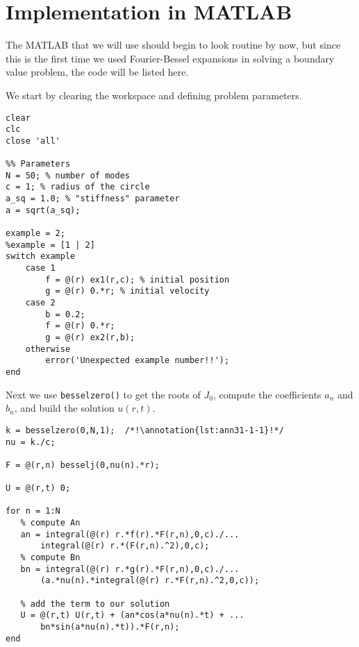 \section{Implementation in MATLAB}
The MATLAB that we will use should begin to look routine by now, but since this is the first time we used Fourier-Bessel expansions in solving a boundary value problem, the code will be listed here.

\vspace{0.25cm}

\noindent We start by clearing the workspace and defining problem parameters.
\begin{lstlisting}[name=lec31-ex1, style=myMatlab]
clear
clc
close 'all'

%% Parameters
N = 50; % number of modes
c = 1; % radius of the circle
a_sq = 1.0; % "stiffness" parameter
a = sqrt(a_sq);

example = 2;
%example = [1 | 2]
switch example
    case 1        
        f = @(r) ex1(r,c); % initial position
        g = @(r) 0.*r; % initial velocity
    case 2
        b = 0.2;
        f = @(r) 0.*r;
        g = @(r) ex2(r,b);
    otherwise
        error('Unexpected example number!!');
end
\end{lstlisting}
Next we use \lstinline[style=myMatlab]{besselzero()} to get the roots of $J_0$, compute the coefficients $a_n$ and $b_n$, and build the solution $u(r,t)$.
\begin{lstlisting}[name=lec31-ex1,style=myMatlab]
%% Get eigenvalues
k = besselzero(0,N,1);  /*!\annotation{lst:ann31-1-1}!*/
nu = k./c;

F = @(r,n) besselj(0,nu(n).*r);

U = @(r,t) 0;

for n = 1:N
   % compute An
   an = integral(@(r) r.*f(r).*F(r,n),0,c)./...
       integral(@(r) r.*(F(r,n).^2),0,c);
   % compute Bn
   bn = integral(@(r) r.*g(r).*F(r,n),0,c)./...
       (a.*nu(n).*integral(@(r) r.*F(r,n).^2,0,c));
   
   % add the term to our solution
   U = @(r,t) U(r,t) + (an*cos(a*nu(n).*t) + ...
       bn*sin(a*nu(n).*t)).*F(r,n);
end
\end{lstlisting}

\vspace{0.25cm}

